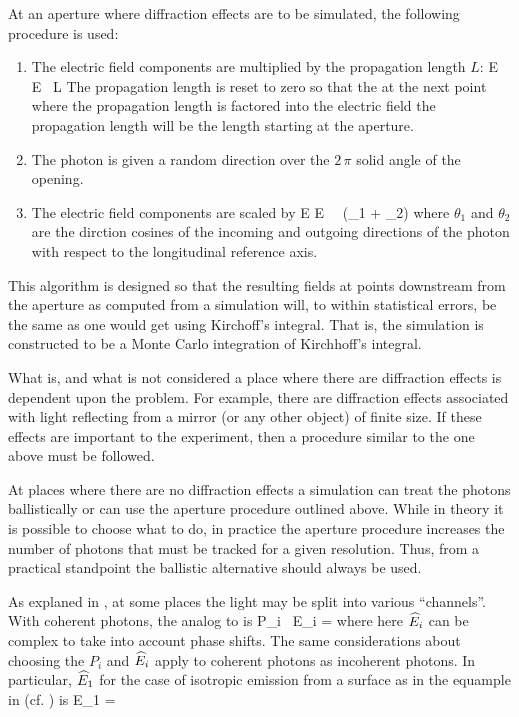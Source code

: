 At an aperture where diffraction effects are to be simulated, the
following procedure is used:
  \begin{enumerate}
  \item
The electric field components are multiplied by the propagation length $L$:
\Begineq
  E \rightarrow E \, L
\Endeq
The propagation length is reset to zero so that the at the next point
where the propagation length is factored into the electric field the
propagation length will be the length starting at the aperture.
  \item
The photon is given a random direction over the $2 \, \pi$ solid angle
of the opening.
  \item
The electric field components are scaled by
\Begineq
  E \rightarrow E \,  \, (\cos\theta_1 + \cos\theta_2)
\Endeq
where $\theta_1$ and $\theta_2$ are the dirction cosines of the
incoming and outgoing directions of the photon with respect to the
longitudinal reference axis.
  \end{enumerate}
This algorithm is designed so that the resulting fields at points
downstream from the aperture as computed from a simulation will, to
within statistical errors, be the same as one would get using
Kirchoff's integral. That is, the simulation is constructed to be a
Monte Carlo integration of Kirchhoff's integral.

What is, and what is not considered a place where there are
diffraction effects is dependent upon the problem. For example, there
are diffraction effects associated with light reflecting from a mirror
(or any other object) of finite size. If these effects are important
to the experiment, then a procedure similar to the one above must be
followed. 

At places where there are no diffraction effects a simulation can
treat the photons ballistically or can use the aperture procedure
outlined above. While in theory it is possible to choose what to do, in
practice the aperture procedure increases the number of photons that
must be tracked for a given resolution. Thus, from a practical standpoint
the ballistic alternative should always be used.

As explaned in , at some places the light may be split
into various ``channels''. With coherent photons, the analog to  is
\Begineq
  P_i \, \what E_i = 
  \label{rpss2}
\Endeq
where here $\widehat E_i$ can be complex to take into account phase shifts.
The same considerations about choosing the $P_i$ and $\widehat E_i$ apply to
coherent photons as incoherent photons. In particular, $\widehat E_1$ for the
case of isotropic emission from a surface as in the equample in
 (cf. ) is
\Begineq
  \what E_1 = 
\Endeq

